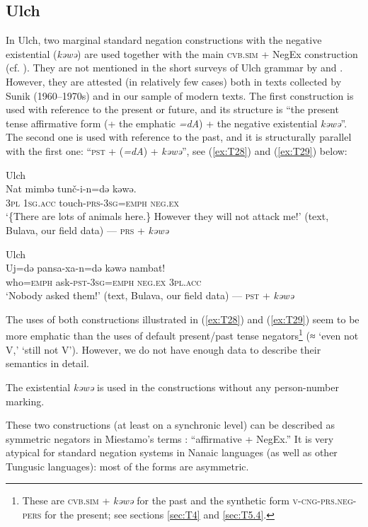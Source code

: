 \documentclass[output=paper,colorlinks,citecolor=brown]{langscibook}
\begin{document}
\subsection{Ulch}\label{sec:T6.2}

In Ulch, two marginal standard negation constructions with the negative existential (\textit{kəwə}) are used together with the main \textsc{cvb.sim} + NegEx construction (cf. ). They are not mentioned in the short surveys of Ulch grammar by \citet{petrova1936a} and \citet{sunik1985a}. However, they are attested (in relatively few cases) both in texts collected by Sunik (1960–1970s) and in our sample of modern texts. The first construction is used with reference to the present or future, and its structure is “the present tense affirmative form (+ the emphatic \textit{=dA}) + the negative existential \textit{kəwə}”. The second one is used with reference to the past, and it is structurally parallel with the first one: “\textsc{pst} + (\textit{=dA}) + \textit{kəwə}”, see (\ref{ex:T28}) and (\ref{ex:T29}) below:

\ea Ulch \label{ex:T28}\\
	\gll Nat	mimbə	tunč-i-n=də	kəwə.\\
	\textsc{3pl}	\textsc{1sg.acc}	touch-\textsc{prs-3sg=emph}	\textsc{neg.ex}\\
	\glt `\{There are lots of animals here.\} However they will not attack me!' (text, Bulava, our field data) — \textsc{prs} + \textit{kəwə}
\z

\ea Ulch \label{ex:T29}\\
	\gll Uj=də	pansa-xa-n=də	kəwə	nambat!\\
	who=\textsc{emph}	ask-\textsc{pst-3sg=emph}	\textsc{neg.ex}	\textsc{3pl.acc}\\
	\glt `Nobody asked them!' (text, Bulava, our field data) — \textsc{pst} + \textit{kəwə}
\z

The uses of both constructions illustrated in (\ref{ex:T28}) and (\ref{ex:T29}) seem to be more emphatic than the uses of default present/past tense negators\footnote{These are \textsc{cvb.sim} + \textit{kəwə} for the past and the synthetic form \textsc{v-cng-prs.neg-pers} for the present; see sections \ref{sec:T4} and \ref{sec:T5.4}.} (≈ ‘even not V,’ ‘still not V’). However, we do not have enough data to describe their semantics in detail.

The existential \textit{kəwə} is used in the constructions without any person-number marking.

These two constructions (at least on a synchronic level) can be described as symmetric negators in Miestamo’s terms \citeyearpar{Miestamo2005}: “affirmative + NegEx.” It is very atypical for standard negation systems in Nanaic languages (as well as other Tungusic languages): most of the forms are asymmetric.
\end{document}
